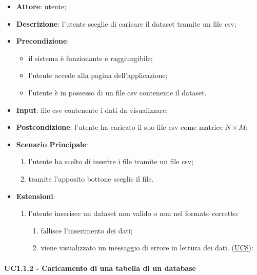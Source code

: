    \begin{itemize}
    \item \textbf{Attore}: utente;
    \item \textbf{Descrizione}: l'utente sceglie di caricare il dataset tramite un file csv;
    \item \textbf{Precondizione}:
    \begin{itemize}
        \item il sistema è funzionante e raggiungibile;
        \item l'utente accede alla pagina dell'applicazione;
        \item l'utente è in possesso di un file csv contenente il dataset.
    \end{itemize}
    \item \textbf{Input}: file csv contenente i dati da visualizzare;
    \item \textbf{Postcondizione}: l'utente ha caricato il suo file csv come matrice $N\times M$;
    \item \textbf{Scenario Principale}: 
        \begin{enumerate}
            \item l'utente ha scelto di inserire i file tramite un file csv;
            \item tramite l'apposito bottone sceglie il file.
        \end{enumerate}
        \item \textbf{Estensioni}:
        \begin{enumerate}
            \item l'utente inserisce un dataset non valido o non nel formato corretto:
                \begin{enumerate}
                    \item fallisce l'inserimento dei dati;
                    \item viene visualizzato un messaggio di errore in lettura dei dati. (\hyperref[uc8]{UC8}):
                \end{enumerate}
        \end{enumerate}  
    \end{itemize}

    
    \paragraph{UC1.1.2 - Caricamento di una tabella di un database}
    \label{uc1.1.2}
    
